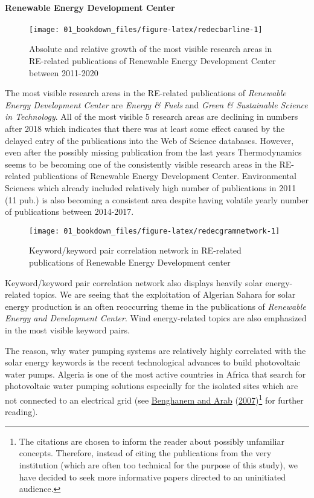 \documentclass[12pt,twoside]{report}
\let\oldparagraph\paragraph
\renewcommand{\paragraph}[1]{\oldparagraph{#1}\mbox{}}
\let\rmarkdownfootnote\footnote%
\def\footnote{\protect\rmarkdownfootnote}
\begin{document}
\hypertarget{renewable-energy-development-center}{%
\paragraph{Renewable Energy Development Center}\label{renewable-energy-development-center}}

\begin{figure}
\texttt{[image: 01\_bookdown\_files/figure-latex/redecbarline-1]} \caption{Absolute and relative growth of the most visible research areas in RE-related publications of Renewable Energy Development Center between 2011-2020}\label{fig:redecbarline}
\end{figure}

The most visible research areas in the RE-related publications of \emph{Renewable Energy Development Center} are \emph{Energy \& Fuels} and \emph{Green \& Sustainable Science in Technology}. All of the most visible 5 research areas are declining in numbers after 2018 which indicates that there was at least some effect caused by the delayed entry of the publications into the Web of Science databases. However, even after the possibly missing publication from the last years Thermodynamics seems to be becoming one of the consistently visible research areas in the RE-related publications of Renewable Energy Development Center. Environmental Sciences which already included relatively high number of publications in 2011 (11 pub.) is also becoming a consistent area despite having volatile yearly number of publications between 2014-2017.

\begin{figure}
\texttt{[image: 01\_bookdown\_files/figure-latex/redecgramnetwork-1]} \caption{Keyword/keyword pair correlation network in RE-related publications of Renewable Energy Development center}\label{fig:redecgramnetwork}
\end{figure}

Keyword/keyword pair correlation network also displays heavily solar energy-related topics. We are seeing that the exploitation of Algerian Sahara for solar energy production is an often reoccurring theme in the publications of \emph{Renewable Energy and Development Center}. Wind energy-related topics are also emphasized in the most visible keyword pairs.

The reason, why water pumping systems are relatively highly correlated with the solar energy keywords is the recent technological advances to build photovoltaic water pumps. Algeria is one of the most active countries in Africa that search for photovoltaic water pumping solutions especially for the isolated sites which are not connected to an electrical grid (see \protect\hyperlink{ref-benghanem2007}{Benghanem and Arab} (\protect\hyperlink{ref-benghanem2007}{2007})\footnote{The citations are chosen to inform the reader about possibly unfamiliar concepts. Therefore, instead of citing the publications from the very institution (which are often too technical for the purpose of this study), we have decided to seek more informative papers directed to an uninitiated audience.} for further reading).
\end{document}
